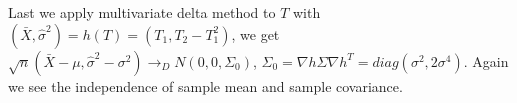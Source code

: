 \documentclass[11pt]{report}
\begin{document}
Last we apply multivariate delta method to $T$ with $(\bar{X},\hat{\sigma}^2)=h(T)=(T_1,T_2-T_1^2)$, we get $\sqrt{n}(\bar{X}-\mu,\hat{\sigma}^2-\sigma^2)\rightarrow_D N(0,0,\Sigma_0)$,  $\Sigma_0=\nabla h \Sigma \nabla h^T = diag(\sigma^2,2\sigma^4)$.
Again we see the independence of sample mean and sample covariance.

\end{document}
